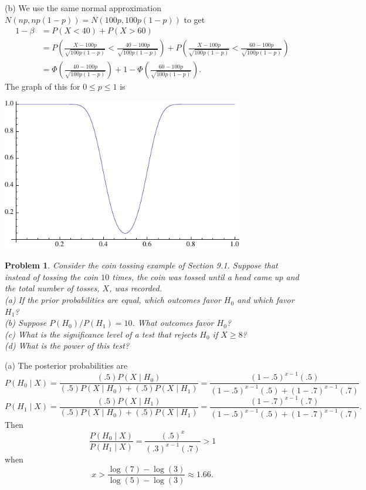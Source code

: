 \documentclass{article}
\newtheorem{problem}{Problem}
\begin{document}
(b) We use the same normal approximation $N(np, np(1-p)) = N(100p, 100p(1-p))$ to get
\begin{align*}
1 - \beta
&= P(X < 40) + P(X > 60)\\
&= P \left ( \frac{X - 100p}{\sqrt{100p(1-p)}} < \frac{40 - 100p}{\sqrt{100p(1-p)}} \right ) + P \left ( \frac{X - 100p}{\sqrt{100p(1-p)}} < \frac{60 - 100p}{\sqrt{100p(1-p)}} \right )\\
&= \Phi \left ( \frac{40 - 100p}{\sqrt{100p(1-p)}} \right ) + 1 - \Phi \left ( \frac{60 - 100p}{\sqrt{100p(1-p)}} \right ).
\end{align*}
The graph of this for $0 \leq p \leq 1$ is
\begin{center}
\includegraphics[width=300pt]{plot.pdf}
\end{center}

\begin{problem}
Consider the coin tossing example of Section 9.1. Suppose that instead of tossing the coin $10$ times, the coin was tossed until a head came up and the total number of tosses, $X$, was recorded.\\
(a) If the prior probabilities are equal, which outcomes favor $H_0$ and which favor $H_1$?\\
(b) Suppose $P(H_0)/P(H_1) = 10$. What outcomes favor $H_0$?\\
(c) What is the significance level of a test that rejects $H_0$ if $X \geq 8$?\\
(d) What is the power of this test?
\end{problem}

(a) The posterior probabilities are
\[
P(H_0 \mid X) = \frac{(.5)P(X \mid H_0)}{(.5)P(X \mid H_0) + (.5)P(X \mid H_1)} = \frac{(1-.5)^{x-1}(.5)}{(1-.5)^{x-1}(.5) + (1-.7)^{x-1}(.7)}
\]
\[
P(H_1 \mid X) = \frac{(.5)P(X \mid H_1)}{(.5)P(X \mid H_0) + (.5)P(X \mid H_1)} = \frac{(1-.7)^{x-1}(.7)}{(1-.5)^{x-1}(.5) + (1-.7)^{x-1}(.7)}.
\]
Then
\[
\frac{P(H_0 \mid X)}{P(H_1 \mid X)} = \frac{(.5)^x}{(.3)^{x-1}(.7)} > 1
\]
when
\[
x > \frac{\log (7) - \log (3)}{\log(5) - \log(3)} \approx 1.66.
\]
\end{document}
